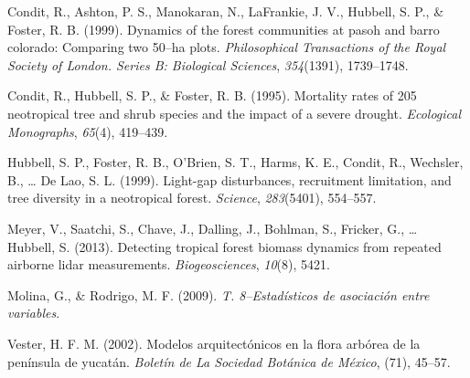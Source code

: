 \documentclass[11pt,]{article}
\begin{document}
\hypertarget{ref-condit1999dynamics}{}
Condit, R., Ashton, P. S., Manokaran, N., LaFrankie, J. V., Hubbell, S.
P., \& Foster, R. B. (1999). Dynamics of the forest communities at pasoh
and barro colorado: Comparing two 50--ha plots. \emph{Philosophical
Transactions of the Royal Society of London. Series B: Biological
Sciences}, \emph{354}(1391), 1739--1748.

\hypertarget{ref-condit1995mortality}{}
Condit, R., Hubbell, S. P., \& Foster, R. B. (1995). Mortality rates of
205 neotropical tree and shrub species and the impact of a severe
drought. \emph{Ecological Monographs}, \emph{65}(4), 419--439.

\hypertarget{ref-hubbell1999light}{}
Hubbell, S. P., Foster, R. B., O'Brien, S. T., Harms, K. E., Condit, R.,
Wechsler, B., \ldots{} De Lao, S. L. (1999). Light-gap disturbances,
recruitment limitation, and tree diversity in a neotropical forest.
\emph{Science}, \emph{283}(5401), 554--557.

\hypertarget{ref-meyer2013detecting}{}
Meyer, V., Saatchi, S., Chave, J., Dalling, J., Bohlman, S., Fricker,
G., \ldots{} Hubbell, S. (2013). Detecting tropical forest biomass
dynamics from repeated airborne lidar measurements.
\emph{Biogeosciences}, \emph{10}(8), 5421.

\hypertarget{ref-molina2009t}{}
Molina, G., \& Rodrigo, M. F. (2009). \emph{T. 8--Estadísticos de
asociación entre variables}.

\hypertarget{ref-vester2002modelos}{}
Vester, H. F. M. (2002). Modelos arquitectónicos en la flora arbórea de
la península de yucatán. \emph{Boletín de La Sociedad Botánica de
México}, (71), 45--57.




\newpage
\singlespacing 
\end{document}
